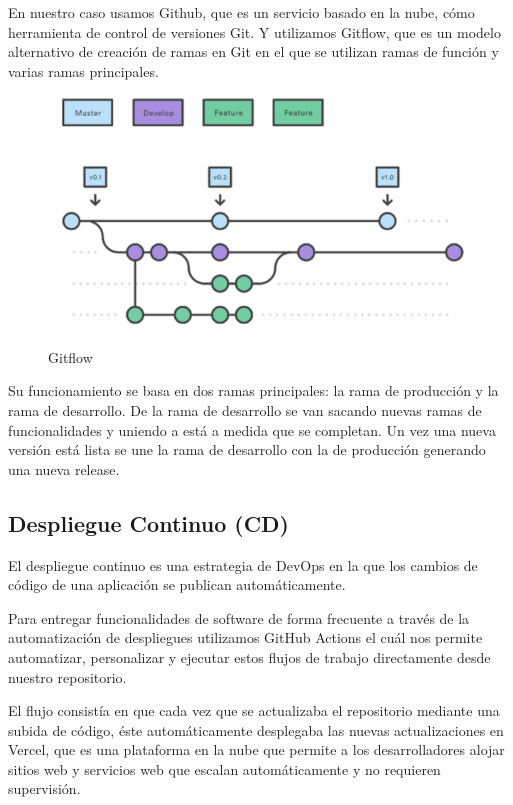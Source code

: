 \documentclass[12pt,twoside,titlepage]{report}
\begin{document}
En nuestro caso usamos Github, que es un servicio basado en la nube, cómo herramienta de control de versiones Git. Y utilizamos Gitflow, que es un modelo alternativo de creación de ramas en Git en el que se utilizan ramas de función y varias ramas principales.

\begin{figure}[H]
    \centering
    \includegraphics[scale=0.58]{DevOps/Gitflow}
    \label{fig:Gitflow}
    \caption{Gitflow}
\end{figure}

Su funcionamiento se basa en dos ramas principales: la rama de producción y la rama de desarrollo. De la rama de desarrollo se van sacando nuevas ramas de funcionalidades y uniendo a está a medida que se completan. Un vez una nueva versión está lista se une la rama de desarrollo con la de producción generando una nueva release.

\subsection{Despliegue Continuo (CD)}

El despliegue continuo es una estrategia de DevOps en la que los cambios de código de una aplicación se publican automáticamente.

Para entregar funcionalidades de software de forma frecuente a través de la automatización de despliegues utilizamos GitHub Actions el cuál nos permite automatizar, personalizar y ejecutar estos flujos de trabajo directamente desde nuestro repositorio.

El flujo consistía en que cada vez que se actualizaba el repositorio mediante una subida de código, éste automáticamente desplegaba las nuevas actualizaciones en Vercel, que es una plataforma en la nube que permite a los desarrolladores alojar sitios web y servicios web que escalan automáticamente y no requieren supervisión.
\end{document}
